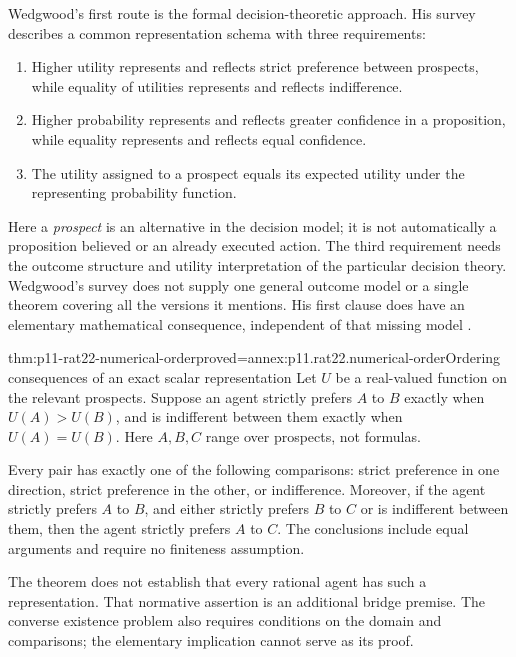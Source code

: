 Wedgwood's first route is the formal decision-theoretic approach. His
survey describes a common representation schema with three requirements:

\begin{enumerate}
\item Higher utility represents and reflects strict preference between
prospects, while equality of utilities represents and reflects indifference.
\item Higher probability represents and reflects greater confidence in a
proposition, while equality represents and reflects equal confidence.
\item The utility assigned to a prospect equals its expected utility under
the representing probability function.
\end{enumerate}

Here a \emph{prospect} is an alternative in the decision model; it is not
automatically a proposition believed or an already executed action. The
third requirement needs the outcome structure and utility interpretation
of the particular decision theory. Wedgwood's survey does not supply one
general outcome model or a single theorem covering all the versions it
mentions. His first clause does have an elementary mathematical
consequence, independent of that missing model
\parencite[p.~140]{RalphWedgwood2021}.

\begin{hbtheorem}{thm:p11-rat22-numerical-order}{proved=annex:p11.rat22.numerical-order}{Ordering consequences of an exact scalar representation}
Let \(U\) be a real-valued function on the relevant prospects. Suppose an
agent strictly prefers \(A\) to \(B\) exactly when \(U(A)>U(B)\), and is
indifferent between them exactly when \(U(A)=U(B)\). Here \(A,B,C\) range
over prospects, not formulas.

Every pair has exactly one of the following comparisons: strict preference
in one direction, strict preference in the other, or indifference.
Moreover, if the agent strictly prefers \(A\) to \(B\), and either strictly
prefers \(B\) to \(C\) or is indifferent between them, then the agent
strictly prefers \(A\) to \(C\). The conclusions include equal arguments
and require no finiteness assumption.
\end{hbtheorem}

The theorem does not establish that every rational agent has such a
representation. That normative assertion is an additional bridge premise.
The converse existence problem also requires conditions on the domain and
comparisons; the elementary implication cannot serve as its proof.

